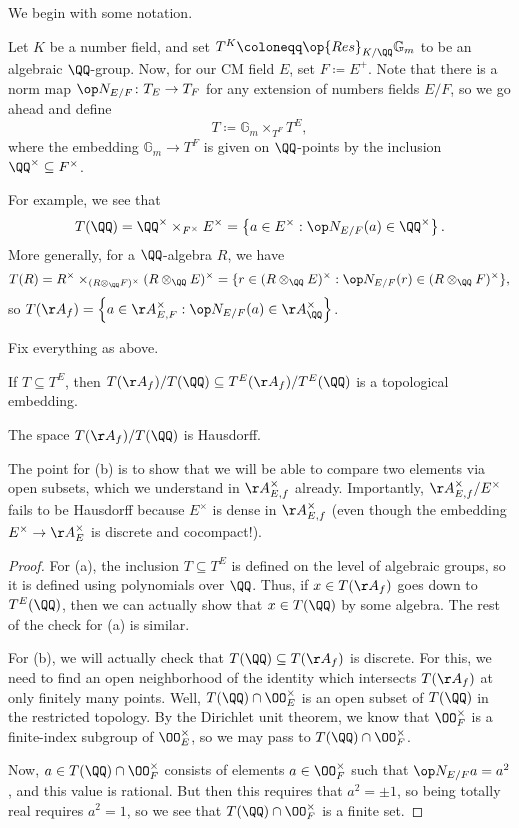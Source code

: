 \documentclass[../notes.tex]{subfiles}
\begin{document}
We begin with some notation.
\begin{notation}
	Let $K$ be a number field, and set $T^K\coloneqq\op{Res}_{K/\QQ}\mathbb G_m$ to be an algebraic $\QQ$-group. Now, for our CM field $E$, set $F\coloneqq E^+$. Note that there is a norm map $\op N_{E/F}\colon T_E\to T_F$ for any extension of numbers fields $E/F$, so we go ahead and define
	\[T\coloneqq\mathbb G_m\times_{T^F}T^E,\]
	where the embedding $\mathbb G_m\to T^F$ is given on $\QQ$-points by the inclusion $\QQ^\times\subseteq F^\times$.
\end{notation}
For example, we see that
\[T(\QQ)=\QQ^\times\times_{F^\times}E^\times=\left\{a\in E^\times:\op N_{E/F}(a)\in\QQ^\times\right\}.\]
More generally, for a $\QQ$-algebra $R$, we have
\[T(R)=R^\times\times_{(R\otimes_\QQ F)^\times}(R\otimes_\QQ E)^\times=\{r\in(R\otimes_\QQ E)^\times:\op N_{E/F}(r)\in(R\otimes_\QQ F)^\times\},\]
so $T(\AA_f)=\left\{a\in\AA_{E,F}^\times:\op N_{E/F}(a)\in\AA_\QQ^\times\right\}$.
\begin{lemma} \label{lem:get-to-hausdorff-quotient}
	Fix everything as above.
	\begin{listalph}
		\item If $T\subseteq T^E$, then $T(\AA_{f})/T(\QQ)\subseteq T^E(\AA_f)/T^E(\QQ)$ is a topological embedding. 
		\item The space $T(\AA_f)/T(\QQ)$ is Hausdorff.
	\end{listalph}
\end{lemma}
The point for (b) is to show that we will be able to compare two elements via open subsets, which we understand in $\AA_{E,f}^\times$ already. Importantly, $\AA_{E,f}^\times/E^\times$ fails to be Hausdorff because $E^\times$ is dense in $\AA_{E,f}^\times$ (even though the embedding $E^\times\to\AA_{E}^\times$ is discrete and cocompact!).
\begin{proof}
	For (a), the inclusion $T\subseteq T^E$ is defined on the level of algebraic groups, so it is defined using polynomials over $\QQ$. Thus, if $x\in T(\AA_f)$ goes down to $T^E(\QQ)$, then we can actually show that $x\in T(\QQ)$ by some algebra. The rest of the check for (a) is similar.

	For (b), we will actually check that $T(\QQ)\subseteq T(\AA_f)$ is discrete. For this, we need to find an open neighborhood of the identity which intersects $T(\AA_f)$ at only finitely many points. Well, $T(\QQ)\cap\OO_E^\times$ is an open subset of $T(\QQ)$ in the restricted topology. By the Dirichlet unit theorem, we know that $\OO_F^\times$ is a finite-index subgroup of $\OO_E^\times$, so we may pass to $T(\QQ)\cap\OO_F^\times$.

	Now, $a\in T(\QQ)\cap\OO_F^\times$ consists of elements $a\in\OO_F^\times$ such that $\op N_{E/F}a=a^2$, and this value is rational. But then this requires that $a^2=\pm1$, so being totally real requires $a^2=1$, so we see that $T(\QQ)\cap\OO_F^\times$ is a finite set.
\end{proof}
\end{document}
